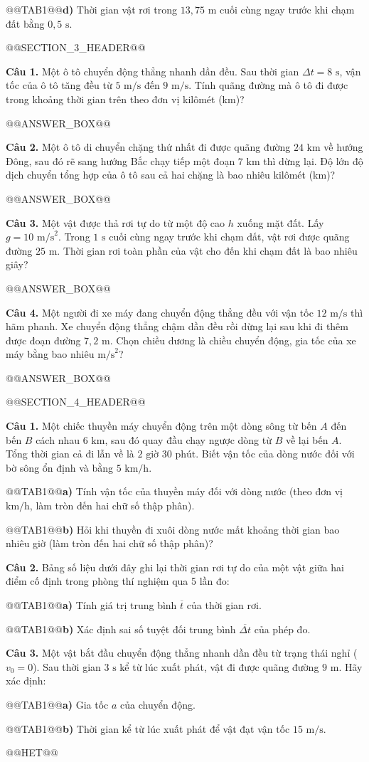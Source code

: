 \documentclass{article}
\begin{document}
@@TAB1@@\textbf{d)} Thời gian vật rơi trong $13{,}75\text{ m}$ cuối cùng ngay trước khi chạm đất bằng $0{,}5\text{ s}$.

@@SECTION_3_HEADER@@

\textbf{Câu 1.} Một ô tô chuyển động thẳng nhanh dần đều. Sau thời gian $\Delta t = 8\text{ s}$, vận tốc của ô tô tăng đều từ $5\text{ m/s}$ đến $9\text{ m/s}$. Tính quãng đường mà ô tô đi được trong khoảng thời gian trên theo đơn vị kilômét (km)?

@@ANSWER_BOX@@

\textbf{Câu 2.} Một ô tô di chuyển chặng thứ nhất đi được quãng đường $24\text{ km}$ về hướng Đông, sau đó rẽ sang hướng Bắc chạy tiếp một đoạn $7\text{ km}$ thì dừng lại. Độ lớn độ dịch chuyển tổng hợp của ô tô sau cả hai chặng là bao nhiêu kilômét (km)?

@@ANSWER_BOX@@

\textbf{Câu 3.} Một vật được thả rơi tự do từ một độ cao $h$ xuống mặt đất. Lấy $g = 10\text{ m/s}^2$. Trong $1\text{ s}$ cuối cùng ngay trước khi chạm đất, vật rơi được quãng đường $25\text{ m}$. Thời gian rơi toàn phần của vật cho đến khi chạm đất là bao nhiêu giây?

@@ANSWER_BOX@@

\textbf{Câu 4.} Một người đi xe máy đang chuyển động thẳng đều với vận tốc $12\text{ m/s}$ thì hãm phanh. Xe chuyển động thẳng chậm dần đều rồi dừng lại sau khi đi thêm được đoạn đường $7{,}2\text{ m}$. Chọn chiều dương là chiều chuyển động, gia tốc của xe máy bằng bao nhiêu $\text{m/s}^2$?

@@ANSWER_BOX@@

@@SECTION_4_HEADER@@

\textbf{Câu 1.} Một chiếc thuyền máy chuyển động trên một dòng sông từ bến $A$ đến bến $B$ cách nhau $6\text{ km}$, sau đó quay đầu chạy ngược dòng từ $B$ về lại bến $A$. Tổng thời gian cả đi lẫn về là $2\text{ giờ } 30\text{ phút}$. Biết vận tốc của dòng nước đối với bờ sông ổn định và bằng $5\text{ km/h}$.

@@TAB1@@\textbf{a)} Tính vận tốc của thuyền máy đối với dòng nước (theo đơn vị $\text{km/h}$, làm tròn đến hai chữ số thập phân).

@@TAB1@@\textbf{b)} Hỏi khi thuyền đi xuôi dòng nước mất khoảng thời gian bao nhiêu giờ (làm tròn đến hai chữ số thập phân)?

\textbf{Câu 2.} Bảng số liệu dưới đây ghi lại thời gian rơi tự do của một vật giữa hai điểm cố định trong phòng thí nghiệm qua 5 lần đo:

@@TAB1@@\textbf{a)} Tính giá trị trung bình $\overline{t}$ của thời gian rơi.

@@TAB1@@\textbf{b)} Xác định sai số tuyệt đối trung bình $\overline{\Delta t}$ của phép đo.

\textbf{Câu 3.} Một vật bắt đầu chuyển động thẳng nhanh dần đều từ trạng thái nghỉ ($v_0 = 0$). Sau thời gian $3\text{ s}$ kể từ lúc xuất phát, vật đi được quãng đường $9\text{ m}$. Hãy xác định:

@@TAB1@@\textbf{a)} Gia tốc $a$ của chuyển động.

@@TAB1@@\textbf{b)} Thời gian kể từ lúc xuất phát để vật đạt vận tốc $15\text{ m/s}$.



@@HET@@
\end{document}
